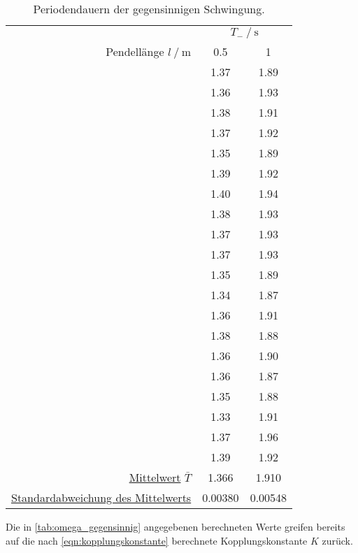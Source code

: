 \begin{table}
    \centering
    \caption{Periodendauern der gegensinnigen Schwingung.}
    \label{tab:gegensinnig}
    \begin{tabular}{r S S}
        \toprule
        &  \\
        \cmidrule(lr){2-3}
        Pendellänge $l \mathbin{/} \si{\meter}$ &
        0.5 &
        1 \\
        \midrule
        & 1.37 & 1.89 \\
        & 1.36 & 1.93 \\
        & 1.38 & 1.91 \\
        & 1.37 & 1.92 \\
        & 1.35 & 1.89 \\
        & 1.39 & 1.92 \\
        & 1.40 & 1.94 \\
        & 1.38 & 1.93 \\
        & 1.37 & 1.93 \\
        & 1.37 & 1.93 \\
        & 1.35 & 1.89 \\
        & 1.34 & 1.87 \\
        & 1.36 & 1.91 \\
        & 1.38 & 1.88 \\
        & 1.36 & 1.90 \\
        & 1.36 & 1.87 \\
        & 1.35 & 1.88 \\
        & 1.33 & 1.91 \\
        & 1.37 & 1.96 \\
        & 1.39 & 1.92 \\
        \midrule
        \hyperref[eqn:mittelwert]{Mittelwert} $\bar{T}$                       & 1.366   & 1.910 \\
        \hyperref[eqn:standardabweichung]{Standardabweichung des Mittelwerts} & 0.00380 & 0.00548 \\
        \bottomrule
    \end{tabular}
\end{table}

Die in \autoref{tab:omega_gegensinnig} angegebenen berechneten Werte
greifen bereits auf die nach \autoref{eqn:kopplungskonstante} berechnete Kopplungskonstante $K$ zurück.

